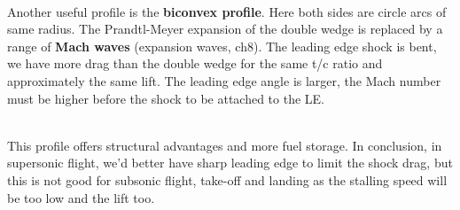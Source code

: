 	\ \\
	
	Another useful profile is the \textbf{biconvex profile}. Here both sides are circle arcs of same radius. The Prandtl-Meyer expansion of the double wedge is replaced by a range of \textbf{Mach waves} (expansion waves, ch8). The leading edge shock is bent, we have more drag than the double wedge for the same t/c ratio and approximately the same lift. The leading edge angle is larger, the Mach number must be higher before the shock to be attached to the LE. 
	
	\ \\ This profile offers structural advantages and more fuel storage. In conclusion, in supersonic flight, we'd better have sharp leading edge to limit the shock drag, but this is not good for subsonic flight, take-off and landing as the stalling speed will be too low and the lift too. 